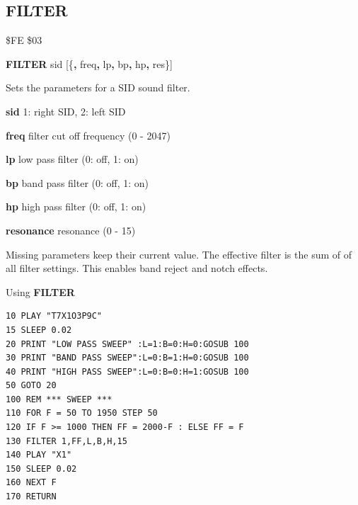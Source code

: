 
\newpage
\subsection{FILTER}
\begin{description}[leftmargin=2cm,style=nextline]
\item [Token:] \$FE \$03
\item [Format:] {\bf FILTER} sid [\{{\bf,} freq{\bf,} lp{\bf,} bp{\bf,}
		hp{\bf,} res\}]
\item [Usage:] Sets the parameters for a SID sound filter.

      {\bf sid} 1: right SID, 2: left SID

      {\bf freq} filter cut off frequency (0 - 2047)

      {\bf lp} low pass filter (0: off, 1: on)

      {\bf bp} band pass filter (0: off, 1: on)

      {\bf hp} high pass filter (0: off, 1: on)

      {\bf resonance} resonance (0 - 15)

\item [Remarks:] Missing parameters keep their current value.
                 The effective filter is the sum of
                 of all filter settings.
                 This enables band reject and notch effects.

\item [Example:]
                Using {\bf FILTER}
\begin{tcolorbox}[colback=black,coltext=white]
\verbatimfont{\codefont}
\begin{verbatim}
10 PLAY "T7X1O3P9C"
15 SLEEP 0.02
20 PRINT "LOW PASS SWEEP" :L=1:B=0:H=0:GOSUB 100
30 PRINT "BAND PASS SWEEP":L=0:B=1:H=0:GOSUB 100
40 PRINT "HIGH PASS SWEEP":L=0:B=0:H=1:GOSUB 100
50 GOTO 20
100 REM *** SWEEP ***
110 FOR F = 50 TO 1950 STEP 50
120 IF F >= 1000 THEN FF = 2000-F : ELSE FF = F
130 FILTER 1,FF,L,B,H,15
140 PLAY "X1"
150 SLEEP 0.02
160 NEXT F
170 RETURN
\end{verbatim}
\end{tcolorbox}
\end{description}


\newpage
